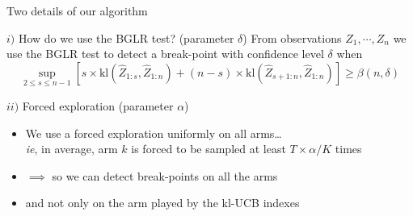 \documentclass[11pt,french,ignorenonframetext,]{beamer}
\begin{document}
\begin{frame}{Two details of our algorithm}



  \begin{exampleblock}{$i)$ How do we use the BGLR test? \hfill{} (parameter $\delta$)}
    From observations $Z_1,\cdots,Z_n$
    we use the BGLR test to detect a break-point
    with confidence level $\delta$
    when
      \[
        \sup_{2 \leq s \leq n-1} \left[s \times \mathrm{kl} \left( \widehat{Z}_{1:s}, \widehat{Z}_{1:n}\right) + (n-s) \times \mathrm{kl} \left( \widehat{Z}_{s+1:n}, \widehat{Z}_{1:n} \right) \right] \geq \beta(n,\delta)
        \]
  \end{exampleblock}

  \pause

  \begin{exampleblock}{$ii)$ Forced exploration \hfill{} (parameter $\alpha$)}
    \begin{itemize}
      \item We use a forced exploration uniformly on all arms\ldots\\
        \emph{ie}, in average, arm $k$ is forced to be sampled at least $T \times \alpha / K$ times
      \item $\implies$ so we can detect break-points on all the arms
      \item and not only on the arm played by the kl-UCB indexes
    \end{itemize}
  \end{exampleblock}

\end{frame}
\end{document}
